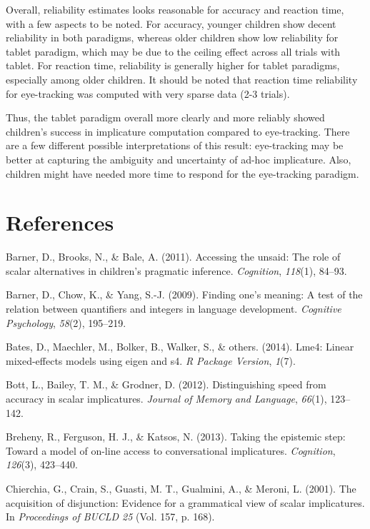 \documentclass[a4paper,man,apacite,floatsintext]{apa6}
\begin{document}
Overall, reliability estimates looks reasonable for accuracy and
reaction time, with a few aspects to be noted. For accuracy, younger
children show decent reliability in both paradigms, whereas older
children show low reliability for tablet paradigm, which may be due to
the ceiling effect across all trials with tablet. For reaction time,
reliability is generally higher for tablet paradigms, especially among
older children. It should be noted that reaction time reliability for
eye-tracking was computed with very sparse data (2-3 trials).

Thus, the tablet paradigm overall more clearly and more reliably showed
children's success in implicature computation compared to eye-tracking.
There are a few different possible interpretations of this result:
eye-tracking may be better at capturing the ambiguity and uncertainty of
ad-hoc implicature. Also, children might have needed more time to
respond for the eye-tracking paradigm.

\newpage

\section*{References}\label{references}

Barner, D., Brooks, N., \& Bale, A. (2011). Accessing the unsaid: The
role of scalar alternatives in children's pragmatic inference.
\emph{Cognition}, \emph{118}(1), 84--93.

Barner, D., Chow, K., \& Yang, S.-J. (2009). Finding one's meaning: A
test of the relation between quantifiers and integers in language
development. \emph{Cognitive Psychology}, \emph{58}(2), 195--219.

Bates, D., Maechler, M., Bolker, B., Walker, S., \& others. (2014).
Lme4: Linear mixed-effects models using eigen and s4. \emph{R Package
Version}, \emph{1}(7).

Bott, L., Bailey, T. M., \& Grodner, D. (2012). Distinguishing speed
from accuracy in scalar implicatures. \emph{Journal of Memory and
Language}, \emph{66}(1), 123--142.

Breheny, R., Ferguson, H. J., \& Katsos, N. (2013). Taking the epistemic
step: Toward a model of on-line access to conversational implicatures.
\emph{Cognition}, \emph{126}(3), 423--440.

Chierchia, G., Crain, S., Guasti, M. T., Gualmini, A., \& Meroni, L.
(2001). The acquisition of disjunction: Evidence for a grammatical view
of scalar implicatures. In \emph{Proceedings of BUCLD 25} (Vol. 157, p.
168).
\end{document}
